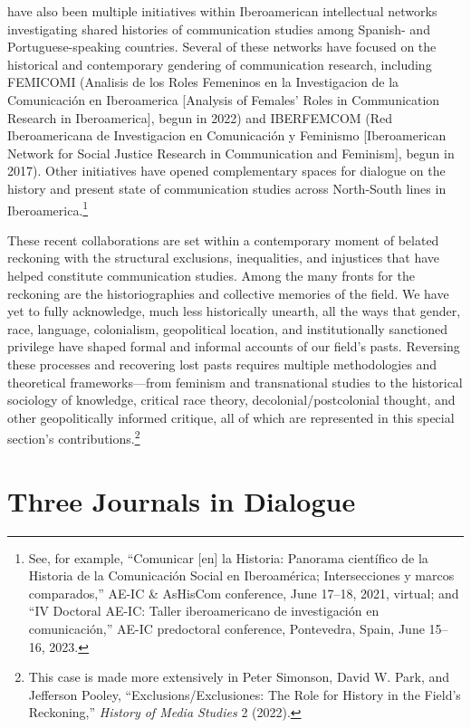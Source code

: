 \documentclass{tufte-handout}
\begin{document}
have also been multiple initiatives within Iberoamerican intellectual
networks investigating shared histories of communication studies among
Spanish- and Portuguese-speaking countries. Several of these networks
have focused on the historical and contemporary gendering of
communication research, including FEMICOMI (Analisis de los Roles
Femeninos en la Investigacion de la Comunicación en Iberoamerica
{[}Analysis of Females' Roles in Communication Research in
Iberoamerica{]}, begun in 2022) and IBERFEMCOM (Red Iberoamericana de
Investigacion en Comunicación y Feminismo {[}Iberoamerican Network for
Social Justice Research in Communication and Feminism{]}, begun in
2017). Other initiatives have opened complementary spaces for dialogue
on the history and present state of communication studies across
North-South lines in Iberoamerica.\footnote{See, for example,
  ``Comunicar {[}en{]} la Historia: Panorama científico de la Historia
  de la Comunicación Social en Iberoamérica; Intersecciones y marcos
  comparados,'' AE-IC \& AsHisCom conference, June 17--18, 2021,
  virtual; and ``IV Doctoral AE-IC: Taller iberoamericano de
  investigación en comunicación,'' AE-IC predoctoral conference,
  Pontevedra, Spain, June 15--16, 2023.}

These recent collaborations are set within a contemporary moment of
belated reckoning with the structural exclusions, inequalities, and
injustices that have helped constitute communication studies. Among the
many fronts for the reckoning are the historiographies and collective
memories of the field. We have yet to fully acknowledge, much less
historically unearth, all the ways that gender, race, language,
colonialism, geopolitical location, and institutionally sanctioned
privilege have shaped formal and informal accounts of our field's pasts.
Reversing these processes and recovering lost pasts requires multiple
methodologies and theoretical frameworks---from feminism and
transnational studies to the historical sociology of knowledge, critical
race theory, decolonial/postcolonial thought, and other geopolitically
informed critique, all of which are represented in this special
section's contributions.\footnote{This case is made more extensively in
  Peter Simonson, David W. Park, and Jefferson Pooley,
  ``Exclusions/Exclusiones: The Role for History in the Field's
  Reckoning,'' \emph{History of Media Studies} 2 (2022).}

\hypertarget{three-journals-in-dialogue}{%
\section{Three Journals in
Dialogue}\label{three-journals-in-dialogue}}
\end{document}
